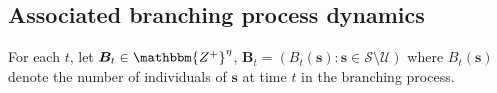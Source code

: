 \documentclass{article}
\theoremstyle{definition}
\begin{document}
       
       
        
        
       




 




\subsection{Associated branching process dynamics}
\label{Branching_process}


For each $t$, let ${{\bm{B}_t} \in \mathbbm{Z^+}^\eta}$, ${\bm{B}_t} =( B_t(\bm{s}):\bm{s} \in \mathcal S \setminus \mathcal U )$
where  $B_t(\bm{s})$ denote the number of individuals of $\bm{s}$ at time $t$ in the branching process.


\end{document}
